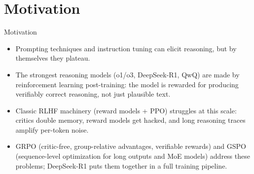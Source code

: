 \section{Motivation}
\begin{frame}{Motivation}
    \begin{itemize}\itemsep0.4em
        \item Prompting techniques and instruction tuning can elicit reasoning, but by themselves they plateau.
        \item The strongest reasoning models (o1/o3, DeepSeek-R1, QwQ) are made by reinforcement learning post-training: the model is rewarded for producing verifiably correct reasoning, not just plausible text.
        \item Classic RLHF machinery (reward models + PPO) struggles at this scale: critics double memory, reward models get hacked, and long reasoning traces amplify per-token noise.
        \item GRPO (critic-free, group-relative advantages, verifiable rewards) and GSPO (sequence-level optimization for long outputs and MoE models) address these problems; DeepSeek-R1 puts them together in a full training pipeline.
    \end{itemize}
\end{frame}
